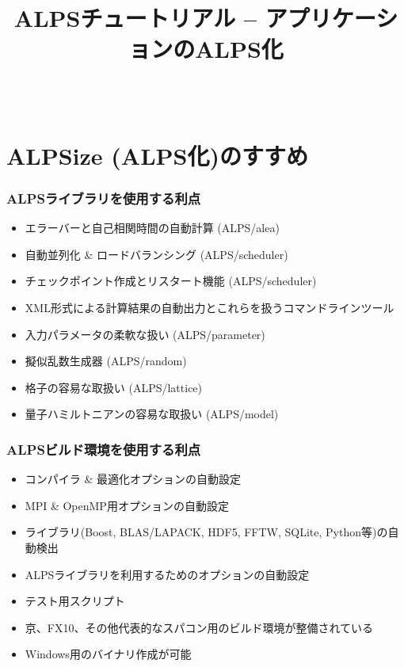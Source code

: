\title{ALPSチュートリアル -- アプリケーションのALPS化}




\begin{frame}
  \titlepage
\end{frame}

\begin{frame}
  \begin{columns}[t]
    \begin{column}{.3\textwidth}
    \end{column}
    \begin{column}{.7\textwidth}
      \tableofcontents
    \end{column}
  \end{columns}
\end{frame}

\section{ALPSize (ALPS化)のすすめ}
\begin{frame}
  \frametitle{ALPSライブラリを使用する利点}
  \begin{itemize}
  \item エラーバーと自己相関時間の自動計算 (ALPS/alea)
  \item 自動並列化 \& ロードバランシング (ALPS/scheduler)
  \item チェックポイント作成とリスタート機能 (ALPS/scheduler)
  \item XML形式による計算結果の自動出力とこれらを扱うコマンドラインツール
  \item 入力パラメータの柔軟な扱い (ALPS/parameter)
  \item 擬似乱数生成器 (ALPS/random)
  \item 格子の容易な取扱い (ALPS/lattice)
  \item 量子ハミルトニアンの容易な取扱い (ALPS/model)
  \end{itemize}
\end{frame}

\begin{frame}
  \frametitle{ALPSビルド環境を使用する利点}
  \begin{itemize}
  \item コンパイラ \& 最適化オプションの自動設定
  \item MPI \& OpenMP用オプションの自動設定
  \item ライブラリ(Boost, BLAS/LAPACK, HDF5, FFTW, SQLite, Python等)の自動検出
  \item ALPSライブラリを利用するためのオプションの自動設定
  \item テスト用スクリプト
  \item 京、FX10、その他代表的なスパコン用のビルド環境が整備されている
  \item Windows用のバイナリ作成が可能
  \end{itemize}
\end{frame}

